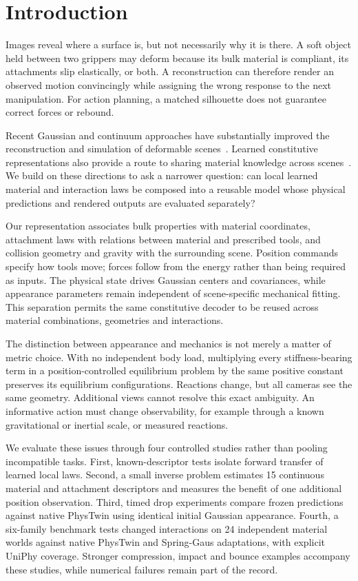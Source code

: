 \documentclass[10pt,twocolumn,letterpaper]{article}
\begin{document}
\section{Introduction}
Images reveal where a surface is, but not necessarily why it is there. A soft object held between two grippers may deform because its bulk material is compliant, its attachments slip elastically, or both. A reconstruction can therefore render an observed motion convincingly while assigning the wrong response to the next manipulation. For action planning, a matched silhouette does not guarantee correct forces or rebound.

Recent Gaussian and continuum approaches have substantially improved the reconstruction and simulation of deformable scenes~\cite{xie2024physgaussian,zhong2024springgaus,jiang2025phystwin}. Learned constitutive representations also provide a route to sharing material knowledge across scenes~\cite{ma2023nclaw,mittal2025uniphy}. We build on these directions to ask a narrower question: can local learned material and interaction laws be composed into a reusable model whose physical predictions and rendered outputs are evaluated separately?

Our representation associates bulk properties with material coordinates, attachment laws with relations between material and prescribed tools, and collision geometry and gravity with the surrounding scene. Position commands specify how tools move; forces follow from the energy rather than being required as inputs. The physical state drives Gaussian centers and covariances, while appearance parameters remain independent of scene-specific mechanical fitting. This separation permits the same constitutive decoder to be reused across material combinations, geometries and interactions.

The distinction between appearance and mechanics is not merely a matter of metric choice. With no independent body load, multiplying every stiffness-bearing term in a position-controlled equilibrium problem by the same positive constant preserves its equilibrium configurations. Reactions change, but all cameras see the same geometry. Additional views cannot resolve this exact ambiguity. An informative action must change observability, for example through a known gravitational or inertial scale, or measured reactions.

We evaluate these issues through four controlled studies rather than pooling incompatible tasks. First, known-descriptor tests isolate forward transfer of learned local laws. Second, a small inverse problem estimates 15 continuous material and attachment descriptors and measures the benefit of one additional position observation. Third, timed drop experiments compare frozen predictions against native PhysTwin using identical initial Gaussian appearance. Fourth, a six-family benchmark tests changed interactions on 24 independent material worlds against native PhysTwin and Spring-Gaus adaptations, with explicit UniPhy coverage. Stronger compression, impact and bounce examples accompany these studies, while numerical failures remain part of the record.
\end{document}

